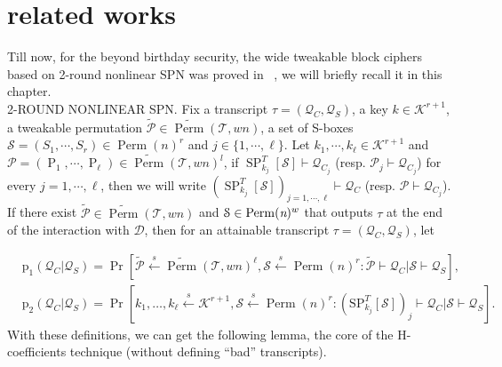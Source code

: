 

\section{related works}
\label{section:related works}

Till now, for the beyond birthday security, the wide tweakable block ciphers based on 2-round nonlinear SPN was proved in ~\cite{cogliati2018wide}, we will briefly recall it in this chapter.\\

\textsc{2-ROUND NONLINEAR SPN.} Fix a transcript $\tau = (\mathcal{Q}_C,\mathcal{Q}_S)$, a key $k \in \mathcal{K}^{r+1}$, a tweakable permutation $\widetilde{\mathcal{P}} \in \widetilde{\operatorname{Perm}}(\mathcal{T}, w n)$,  a set of S-boxes $\mathcal{S}=(S_1, \cdots  ,S_r) \in \operatorname{Perm}(n)^r $ and $j \in \{1, \cdots, \ell \}$. Let $k_1, \cdots ,k_{\ell} \in \mathcal{K}^{r+1}$ and $\mathcal{P} = (\operatorname{P}_1, \cdots ,\operatorname{P}_\ell) \in \widetilde{\operatorname{Perm}}(\mathcal{T},wn)^l$, if $\operatorname{SP}_{k_j}^{T}[\mathcal{S}] \vdash \mathcal{Q}_{C_j}$ (resp. $\mathcal{P}_j \vdash \mathcal{Q}_{C_j}$) for every $j = 1, \cdots ,\ell$, then we will write $(\operatorname{SP} ^{T}_{k_j}[\mathcal{S}])_{j = 1, \cdots ,\ell} \vdash \mathcal{Q}_C$ (resp. $\mathcal{P} \vdash \mathcal{Q}_{C_j}$).\\

If there exist $\widetilde{\mathcal{P}} \in \widetilde{\operatorname{Perm}}(\mathcal{T},w n)$ and $\mathcal{S} \in \operatorname{Perm}(\emph{n})^w$ that outputs $\tau$ at the end of the interaction with $\mathcal{D}$, then for an attainable transcript $\tau = (\mathcal{Q}_C,\mathcal{Q}_S)$, let

$$
\begin{aligned}
&\mathrm{p}_{1}\left(\mathcal{Q}_{C} | \mathcal{Q}_{S}\right)=\operatorname{Pr}\left[\widetilde{\mathcal{P}} \stackrel{s}{\leftarrow} \widetilde{{\operatorname{Perm}}}(\mathcal{T}, w n)^{\ell}, \mathcal{S} \stackrel{s}{\leftarrow} \operatorname{Perm}(n)^{r}: \widetilde{\mathcal{P}} \vdash \mathcal{Q}_{C} | \mathcal{S} \vdash \mathcal{Q}_{S}\right],\\
&\mathrm{p}_{2}\left(\mathcal{Q}_{C} | \mathcal{Q}_{S}\right)=\operatorname{Pr}\left[k_{1}, \ldots, k_{\ell} \stackrel{s}{\leftarrow} \mathcal{K}^{r+1}, \mathcal{S} \stackrel{s}{\leftarrow} \operatorname{Perm}(n)^{r}:\left(\mathrm{SP}_{k_{j}}^{T}[\mathcal{S}]\right)_{j} \vdash \mathcal{Q}_{C} | \mathcal{S} \vdash \mathcal{Q}_{S}\right].
\end{aligned}
$$
With these definitions, we can get the following lemma, the core of the H-coefficients technique (without defining ``bad'' transcripts).\\

